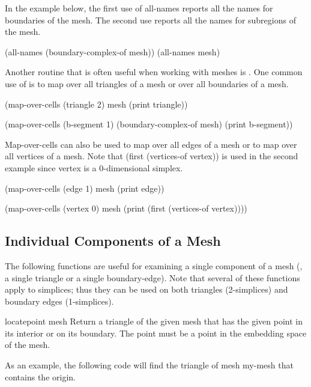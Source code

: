 In the example below, the first use of {\keylisp all-names} reports
all the names for boundaries of the mesh.  The second use reports all
the names for subregions of the mesh.

\begin{code}
(all-names (boundary-complex-of mesh))
(all-names mesh)
\end{code}

Another routine that is often useful when working with meshes is
.  One common use of 
is to map over all triangles of a mesh or over all boundaries of a
mesh.
\begin{code}
(map-over-cells (triangle 2) mesh
   (print triangle))
\end{code}

\begin{code}
(map-over-cells (b-segment 1) (boundary-complex-of mesh)
   (print b-segment))
\end{code}

{\sf Map-over-cells} can also be used to map over all edges of a mesh
or to map over all vertices of a mesh.  Note that {\sf (first
(vertices-of vertex))} is used in the second example since {\sf
vertex} is a $0$-dimensional simplex.
\begin{code}
(map-over-cells (edge 1) mesh
   (print edge))

(map-over-cells (vertex 0) mesh
   (print (first (vertices-of vertex))))
\end{code}


\subsection{Individual Components of a Mesh}

The following functions are useful for examining a single component of
a mesh (\eg, a single triangle or a single boundary-edge).  Note that
several of these functions apply to simplices; thus they can be used
on both triangles (2-simplices) and boundary edges (1-simplices).

\begin{functiondef}{locate}{point mesh}
Return a triangle of the given mesh that has the given point in its
interior or on its boundary.  The point must be a point in the
embedding space of the mesh.
\end{functiondef}

As an example, the following code will find the triangle of mesh {\sf
my-mesh} that contains the origin.

